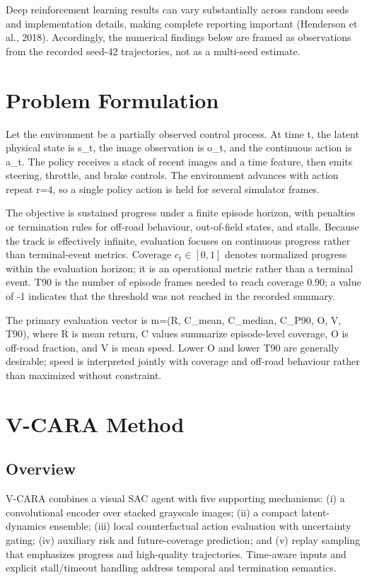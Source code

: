 \documentclass[11pt]{article}
\begin{document}
Deep reinforcement learning results can vary substantially across random
seeds and implementation details, making complete reporting important
(Henderson et al., 2018). Accordingly, the numerical findings below are
framed as observations from the recorded seed-42 trajectories, not as a
multi-seed estimate.

\section{Problem Formulation}\label{problem-formulation}

Let the environment be a partially observed control process. At time t,
the latent physical state is s\_t, the image observation is o\_t, and
the continuous action is a\_t. The policy receives a stack of recent
images and a time feature, then emits steering, throttle, and brake
controls. The environment advances with action repeat r=4, so a single
policy action is held for several simulator frames.

The objective is sustained progress under a finite episode horizon, with
penalties or termination rules for off-road behaviour, out-of-field
states, and stalls. Because the track is effectively infinite,
evaluation focuses on continuous progress rather than terminal-event
metrics. Coverage \(c_t\in[0,1]\) denotes normalized progress within the
evaluation horizon; it is an operational metric rather than a terminal
event. T90 is the number of episode frames needed to reach coverage
0.90; a value of -1 indicates that the threshold was not reached in the
recorded summary.

The primary evaluation vector is m=(R, C\_mean, C\_median, C\_P90, O, V,
T90), where R is mean return, C values summarize episode-level coverage,
O is off-road fraction, and V is mean speed. Lower O and lower T90 are
generally desirable; speed is interpreted jointly with coverage and
off-road behaviour rather than maximized without constraint.

\section{V-CARA Method}\label{v-cara-method}

\subsection{Overview}\label{overview}

V-CARA combines a visual SAC agent with five supporting mechanisms: (i)
a convolutional encoder over stacked grayscale images; (ii) a compact
latent-dynamics ensemble; (iii) local counterfactual action evaluation
with uncertainty gating; (iv) auxiliary risk and future-coverage
prediction; and (v) replay sampling that emphasizes progress and
high-quality trajectories. Time-aware inputs and explicit stall/timeout
handling address temporal and termination semantics.
\end{document}
